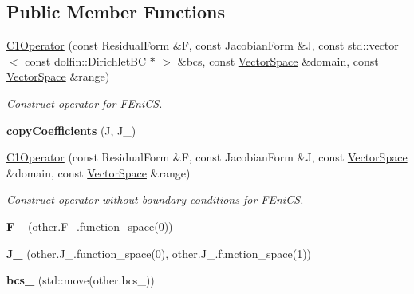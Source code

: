 \subsection*{Public Member Functions}
\begin{DoxyCompactItemize}
\item 
\hyperlink{classSpacy_1_1FEniCS_1_1C1Operator_a3e578031e731cad3f4fa8b7364f8ec97}{C1\-Operator} (const Residual\-Form \&F, const Jacobian\-Form \&J, const std\-::vector$<$ const dolfin\-::\-Dirichlet\-B\-C $\ast$ $>$ \&bcs, const \hyperlink{classSpacy_1_1VectorSpace}{Vector\-Space} \&domain, const \hyperlink{classSpacy_1_1VectorSpace}{Vector\-Space} \&range)
\begin{DoxyCompactList}\small\item\em Construct operator for F\-Eni\-C\-S. \end{DoxyCompactList}\item 
\hypertarget{classSpacy_1_1FEniCS_1_1C1Operator_ac3126fcbfd9af809d0636d2bfff9703c}{{\bfseries copy\-Coefficients} (J, J\-\_\-)}\label{classSpacy_1_1FEniCS_1_1C1Operator_ac3126fcbfd9af809d0636d2bfff9703c}

\item 
\hyperlink{classSpacy_1_1FEniCS_1_1C1Operator_ac7f46e5ef2bf30414ac6b91028080a1f}{C1\-Operator} (const Residual\-Form \&F, const Jacobian\-Form \&J, const \hyperlink{classSpacy_1_1VectorSpace}{Vector\-Space} \&domain, const \hyperlink{classSpacy_1_1VectorSpace}{Vector\-Space} \&range)
\begin{DoxyCompactList}\small\item\em Construct operator without boundary conditions for F\-Eni\-C\-S. \end{DoxyCompactList}\item 
\hypertarget{classSpacy_1_1FEniCS_1_1C1Operator_af56cc1d94912742db3dc1f811cf1c99b}{{\bfseries F\-\_\-} (other.\-F\-\_\-.\-function\-\_\-space(0))}\label{classSpacy_1_1FEniCS_1_1C1Operator_af56cc1d94912742db3dc1f811cf1c99b}

\item 
\hypertarget{classSpacy_1_1FEniCS_1_1C1Operator_a8907d5a84e6d5558de5e63c215e1b5d6}{{\bfseries J\-\_\-} (other.\-J\-\_\-.\-function\-\_\-space(0), other.\-J\-\_\-.\-function\-\_\-space(1))}\label{classSpacy_1_1FEniCS_1_1C1Operator_a8907d5a84e6d5558de5e63c215e1b5d6}

\item 
\hypertarget{classSpacy_1_1FEniCS_1_1C1Operator_a601e8c31ed240c16b6318702461caa92}{{\bfseries bcs\-\_\-} (std\-::move(other.\-bcs\-\_\-))}\label{classSpacy_1_1FEniCS_1_1C1Operator_a601e8c31ed240c16b6318702461caa92}


\end{DoxyCompactItemize}
